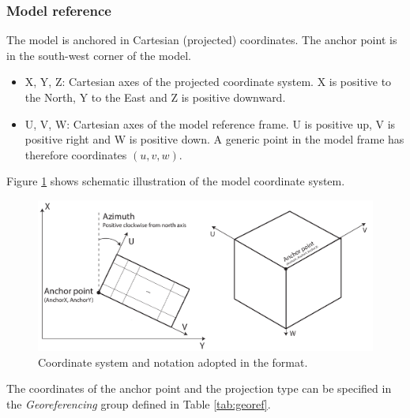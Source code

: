 \documentclass[10pt,a4paper]{article}
\begin{document}
\subsubsection{Model reference}

The model is anchored in Cartesian (projected) coordinates. The anchor point is in the south-west corner of the model. 

\begin{itemize}
\item X, Y, Z: Cartesian axes of the projected coordinate system. X is positive to the North, Y to the East and Z is positive downward. 

\item U, V, W: Cartesian axes of the model reference frame. U is positive up, V is positive right and W is positive down. A generic point in the model frame has therefore coordinates $(u,v,w)$.
\end{itemize}

Figure \ref{fig:reference} shows schematic illustration of the model coordinate system.

\begin{figure}
\centerline{\includegraphics[width=\textwidth]{Figs/reference.pdf}}
\caption{Coordinate system and notation adopted in the format.}
\label{fig:reference}
\end{figure}

The coordinates of the anchor point and the projection type can be specified in the \textit{Georeferencing} group defined in Table \ref{tab:georef}. 
\end{document}

